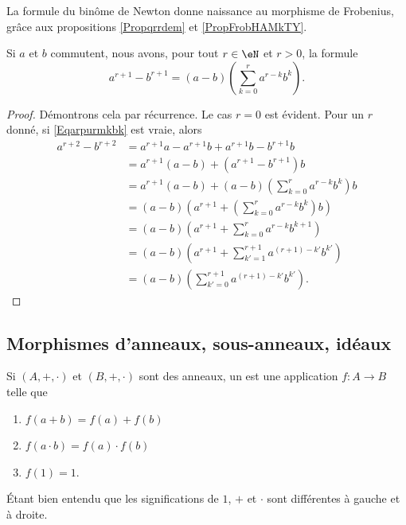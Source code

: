 \begin{remark}
La formule du binôme de Newton donne naissance au morphisme de Frobenius, grâce aux propositions \ref{Propqrrdem} et \ref{PropFrobHAMkTY}.
\end{remark}

\begin{lemma}
    Si \( a\) et \( b\) commutent, nous avons, pour tout \( r \in \eN \) et \( r > 0\), la formule
    \begin{equation}        \label{Eqarpurmkbk}
        a^{r+1}-b^{r+1}=(a-b)\left(\sum_{k=0}^ra^{r-k}b^k\right).
    \end{equation}
\end{lemma}

\begin{proof}
  Démontrons cela par récurrence. Le cas \( r = 0 \) est évident. Pour
  un \( r \) donné, si \eqref{Eqarpurmkbk} est vraie, alors
  \begin{align*}
    a^{r+2}-b^{r+2}&= a^{r+1}a - a^{r+1}b +a^{r+1}b - b^{r+1}b\\
    &= a^{r+1}(a - b) + (a^{r+1} - b^{r+1})b\\
    &= a^{r+1}(a - b) + (a-b)\left(\sum_{k=0}^ra^{r-k}b^k\right)b\\
    &= (a - b) \left(a^{r+1} + \left(\sum_{k=0}^ra^{r-k}b^k\right)b\right)\\
    &= (a - b) \left(a^{r+1} + \sum_{k=0}^ra^{r-k}b^{k + 1}\right)\\
    &= (a - b) \left(a^{r+1} + \sum_{k'=1}^{r+1}a^{(r+1)-k'}b^{k'}\right)\\
    &= (a - b) \left(\sum_{k'=0}^{r+1}a^{(r+1)-k'}b^{k'}\right).
  \end{align*}
\end{proof}

\subsection{Morphismes d'anneaux, sous-anneaux, idéaux}

\begin{definition}      \label{DEFooSPHPooCwjzuz}
    Si \( (A,+,\cdot)\) et \( (B,+,\cdot)\) sont des anneaux, un  est une application \( f\colon A\to B\) telle que
    \begin{enumerate}
        \item \( f(a+b)=f(a)+f(b)\)
        \item
            \( f(a\cdot b)=f(a)\cdot f(b)\)
        \item
            \( f(1)=1\).
    \end{enumerate}
    Étant bien entendu que les significations de \( 1\), $+$ et \( \cdot\) sont différentes à gauche et à droite.
\end{definition}

